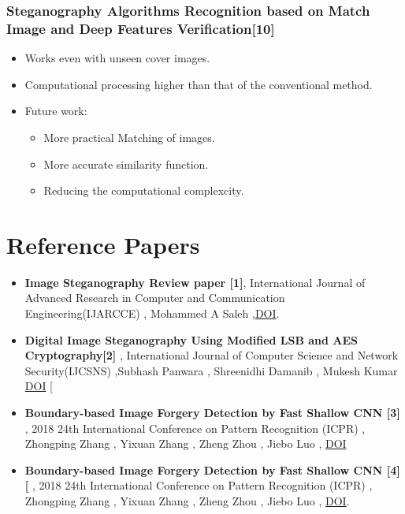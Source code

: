 \documentclass{beamer} %
\theoremstyle{definition} %
\begin{document}
\begin{frame}
	\frametitle{Steganography Algorithms Recognition based on Match Image and Deep Features Verification[10] }
	\begin{itemize}
		\item Works even with unseen cover images.
		\item Computational processing higher than that of the conventional method.
		\item Future work:
		\begin{itemize}
			\item More practical Matching of images.
			\item More accurate similarity function.
			\item Reducing the computational complexcity.
		\end{itemize}
	\end{itemize}
\end{frame}
\section{Reference Papers}

\begin{itemize}
	\item{\textbf{Image Steganography Review paper [1]}, International Journal of Advanced Research in Computer and Communication Engineering(IJARCCE) , Mohammed A  Saleh ,\href{https://ijarcce.com/wp-content/uploads/2018/10/IJARCCE20187910.pdf} {DOI}. }
\end{itemize}

\begin{itemize}
	\item{\textbf{Digital Image Steganography Using Modified LSB and AES Cryptography[2]} ,   International Journal of Computer Science and Network Security(IJCSNS) ,Subhash Panwara , Shreenidhi Damanib , Mukesh Kumar \href{http://www.ijrerd.com/papers/v3-i6/3-IJRERD-C149.pdf}{DOI} [ }
	\end{itemize}
\begin{itemize}
	\item{\textbf{Boundary-based Image Forgery Detection by Fast Shallow CNN
	[3]} , 2018 24th International Conference on Pattern Recognition (ICPR) , Zhongping Zhang , Yixuan Zhang , Zheng Zhou , Jiebo Luo , \href{http://doi.org/10.1109/ICPR.2018.8545074} {DOI}  }

\end{itemize}

\begin{itemize}
	\item {\textbf{Boundary-based Image Forgery Detection by Fast Shallow CNN [4]  [ } , 2018 24th International Conference on Pattern Recognition (ICPR) , Zhongping Zhang , Yixuan Zhang , Zheng Zhou , Jiebo Luo , \href{https://doi.org/10. 1109/ICPR.2018.8545074}{DOI}. }
\end{itemize}
\end{document}
